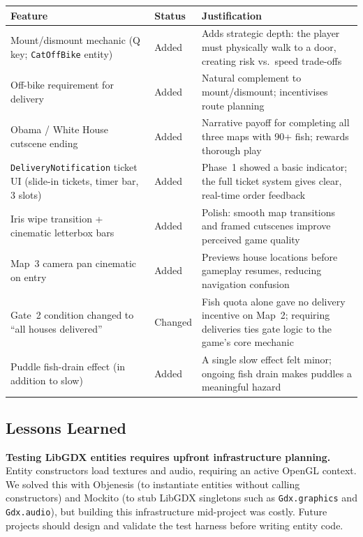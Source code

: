 \documentclass[12pt]{article}
\begin{document}
\begin{center}
\renewcommand{\arraystretch}{1.25}
\begin{tabular}{>{\raggedright}p{5.2cm} p{1.2cm} >{\raggedright\arraybackslash}p{6.8cm}}
\toprule
\textbf{Feature} & \textbf{Status} & \textbf{Justification} \\
\midrule
Mount/dismount mechanic (Q key; \texttt{CatOffBike} entity) & Added & Adds strategic depth: the player must physically walk to a door, creating risk vs.\ speed trade-offs \\
Off-bike requirement for delivery & Added & Natural complement to mount/dismount; incentivises route planning \\
Obama / White House cutscene ending & Added & Narrative payoff for completing all three maps with 90+ fish; rewards thorough play \\
\texttt{DeliveryNotification} ticket UI (slide-in tickets, timer bar, 3 slots) & Added & Phase~1 showed a basic indicator; the full ticket system gives clear, real-time order feedback \\
Iris wipe transition + cinematic letterbox bars & Added & Polish: smooth map transitions and framed cutscenes improve perceived game quality \\
Map~3 camera pan cinematic on entry & Added & Previews house locations before gameplay resumes, reducing navigation confusion \\
Gate~2 condition changed to ``all houses delivered'' & Changed & Fish quota alone gave no delivery incentive on Map~2; requiring deliveries ties gate logic to the game's core mechanic \\
Puddle fish-drain effect (in addition to slow) & Added & A single slow effect felt minor; ongoing fish drain makes puddles a meaningful hazard \\
\bottomrule
\end{tabular}
\end{center}

\subsection{Lessons Learned}

\textbf{Testing LibGDX entities requires upfront infrastructure planning.}
Entity constructors load textures and audio, requiring an active OpenGL context. We solved this with Objenesis (to instantiate entities without calling constructors) and Mockito (to stub LibGDX singletons such as \texttt{Gdx.graphics} and \texttt{Gdx.audio}), but building this infrastructure mid-project was costly. Future projects should design and validate the test harness before writing entity code.
\end{document}
